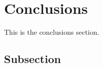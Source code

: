\section{Conclusions}\label{Section label}
This is the conclusions section.
\subsection{Subsection}\label{subsection}